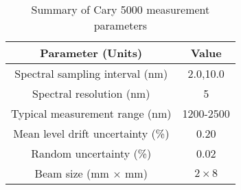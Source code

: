 \begin{table}[h!]
\caption{Summary of Cary 5000 measurement parameters \label{tabCary5000pars}}
\begin{center}
\begin{tabular}{ c c }
\hline
        Parameter (Units) & Value \\ 
\hline
        Spectral sampling interval (nm) & 2.0,10.0 \\
        Spectral resolution (nm) & 5 \\
        Typical measurement range (nm) & 1200-2500 \\
		Mean level drift uncertainty (\%) & 0.20 \\
		Random uncertainty (\%) & 0.02 \\
 		Beam size (mm $\times$ mm) & $2 \times 8$ \\
    \hline
    \end{tabular}
\end{center}
\end{table}